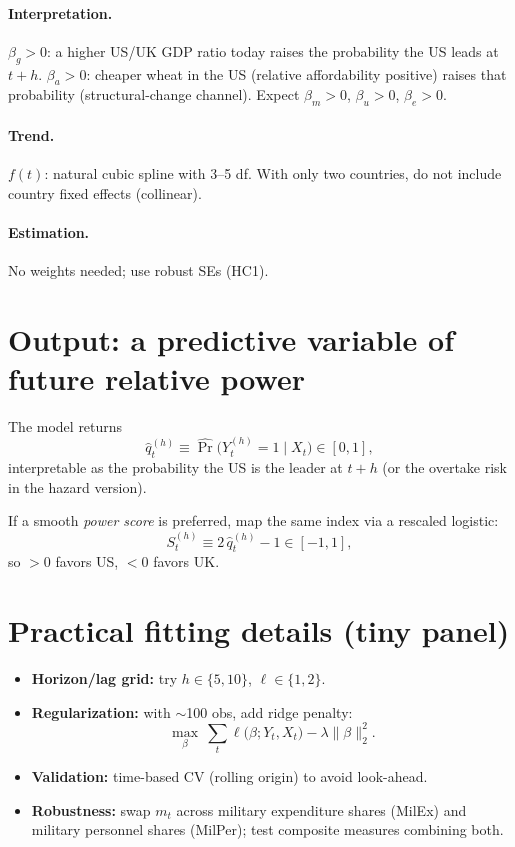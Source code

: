 \documentclass[11pt]{article}
\begin{document}
\paragraph{Interpretation.}
$\beta_g>0$: a higher US/UK GDP ratio today raises the probability the US leads at $t+h$.
$\beta_a>0$: cheaper wheat in the US (relative affordability positive) raises that probability (structural-change channel).
Expect $\beta_m>0$, $\beta_u>0$, $\beta_e>0$.

\paragraph{Trend.}
$f(t)$: natural cubic spline with 3--5 df. With only two countries, do not include country fixed effects (collinear).

\paragraph{Estimation.}
No weights needed; use robust SEs (HC1).

\section{Output: a predictive variable of future relative power}

The model returns
\[
\hat q^{(h)}_t \equiv \widehat{\Pr}\!\big(Y^{(h)}_t=1\mid X_t\big)\in[0,1],
\]
interpretable as the probability the US is the leader at $t+h$ (or the overtake risk in the hazard version).

If a smooth \emph{power score} is preferred, map the same index via a rescaled logistic:
\[
S^{(h)}_t \equiv 2\,\hat q^{(h)}_t - 1 \in [-1,1],
\]
so $>0$ favors US, $<0$ favors UK.

\section{Practical fitting details (tiny panel)}

\begin{itemize}[leftmargin=1.5em]
  \item \textbf{Horizon/lag grid:} try $h\in\{5,10\}$, $\ell\in\{1,2\}$.
  \item \textbf{Regularization:} with $\sim$100 obs, add ridge penalty:
  \[
  \max_{\beta}\ \sum_t \ell\big(\beta;Y_t,X_t\big) - \lambda\|\beta\|_2^2.
  \]
  \item \textbf{Validation:} time-based CV (rolling origin) to avoid look-ahead.
  \item \textbf{Robustness:} swap $m_t$ across military expenditure shares (MilEx) and military personnel shares (MilPer); test composite measures combining both.
\end{itemize}
\end{document}
